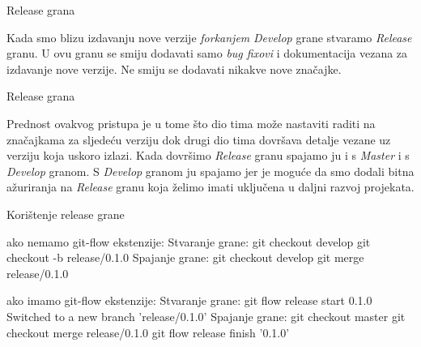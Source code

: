 \documentclass[10pt]{beamer}
\begin{document}
\begin{frame}{Release grana}

Kada smo blizu izdavanju nove verzije \textit{forkanjem} \textit{Develop} grane stvaramo \textit{Release} granu.
U ovu granu se smiju dodavati samo \textit{bug fixovi} i dokumentacija vezana za izdavanje nove verzije. Ne smiju se dodavati nikakve nove značajke.

{
\setlength{\fboxsep}{1pt}
\setlength{\fboxrule}{1pt}
}

\end{frame}

\begin{frame}{Release grana}

Prednost ovakvog pristupa je u tome što dio tima može nastaviti raditi na značajkama za sljedeću verziju dok drugi dio tima dovršava detalje vezane uz verziju koja uskoro izlazi.
Kada dovršimo \textit{Release} granu spajamo ju i s \textit{Master} i s \textit{Develop} granom. S \textit{Develop} granom ju spajamo jer je moguće da smo dodali bitna ažuriranja na \textit{Release} granu koja želimo imati uključena u daljni razvoj projekata.

\end{frame}


\begin{frame}{Korištenje release grane}

ako nemamo git-flow ekstenzije:
Stvaranje grane:
git checkout develop
git checkout -b release/0.1.0
Spajanje grane:
git checkout develop
git merge release/0.1.0

ako imamo git-flow ekstenzije:
Stvaranje grane:
git flow release start 0.1.0
Switched to a new branch 'release/0.1.0'
Spajanje grane:
git checkout master
git checkout merge release/0.1.0
git flow release finish '0.1.0'

\end{frame}
\end{document}

